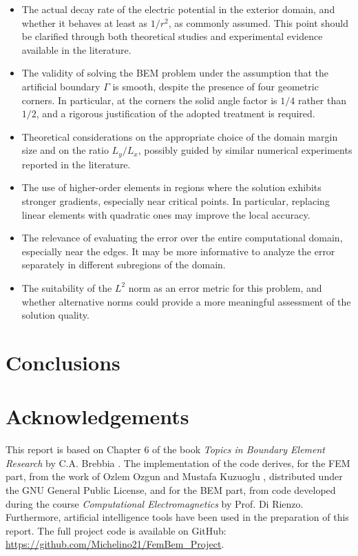 \documentclass[11pt,onecolumn]{article}
\begin{document}
\begin{itemize}
    \item The actual decay rate of the electric potential in the exterior domain, and whether it behaves at least as $1/r^2$, as commonly assumed. This point should be clarified through both theoretical studies and experimental evidence available in the literature.
    
    \item The validity of solving the BEM problem under the assumption that the artificial boundary $\Gamma$ is smooth, despite the presence of four geometric corners. In particular, at the corners the solid angle factor is $1/4$ rather than $1/2$, and a rigorous justification of the adopted treatment is required.
    
    \item Theoretical considerations on the appropriate choice of the domain margin size and on the ratio $L_y/L_x$, possibly guided by similar numerical experiments reported in the literature.
    
    \item The use of higher-order elements in regions where the solution exhibits stronger gradients, especially near critical points. In particular, replacing linear elements with quadratic ones may improve the local accuracy.
    
    \item The relevance of evaluating the error over the entire computational domain, especially near the edges. It may be more informative to analyze the error separately in different subregions of the domain.
    
    \item The suitability of the $L^2$ norm as an error metric for this problem, and whether alternative norms could provide a more meaningful assessment of the solution quality.
\end{itemize}
\section{Conclusions}

\section{Acknowledgements}

This report is based on Chapter 6 of the book \textit{Topics in Boundary Element Research} by C.A. Brebbia \cite{brebbia1990}. 
The implementation of the code derives, for the FEM part, from the work of Ozlem Ozgun and Mustafa Kuzuoglu \cite{ozgun2018}, distributed under the GNU General Public License, and for the BEM part, from code developed during the course \textit{Computational Electromagnetics} by Prof. Di Rienzo. 
Furthermore, artificial intelligence tools have been used in the preparation of this report. The full project code is available on GitHub: \url{https://github.com/Michelino21/FemBem_Project}.
\end{document}
